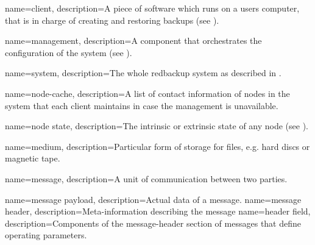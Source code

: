 {
    name={client},
    description={A piece of software which runs on a users computer, that is in charge of creating and restoring backups (see ).}
}

{
    name={management},
    description={A component that orchestrates the configuration of the system (see ).}
}

{
    name={system},
    description={The whole redbackup system as described in .}
}

{
    name={node-cache},
    description={A list of contact information of nodes in the system that each client maintains in case the management is unavailable.}
}

{
    name={node state},
    description={The intrinsic or extrinsic state of any node (see ).}
}

{
    name={medium},
    description={Particular form of storage for files, e.g. hard discs or magnetic tape.}
}

{
    name={message},
    description={A unit of communication between two parties.}
}

{
    name={message payload},
    description={Actual data of a \gls{message}.}
}
{
    name={message header},
    description={Meta-information describing the \gls{message}}
}
{
    name={header field},
    description={Components of the \gls{message-header} section of \glspl{message} that define operating parameters.}
}

